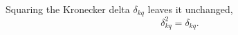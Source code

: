 \documentclass{article}
\begin{document}
Squaring the Kronecker delta $\delta_{kq}$ leaves it unchanged,
\begin{equation}
\delta_{kq}^2 = \delta_{kq} .
\label{eq:kd}
\end{equation}
\end{document}
